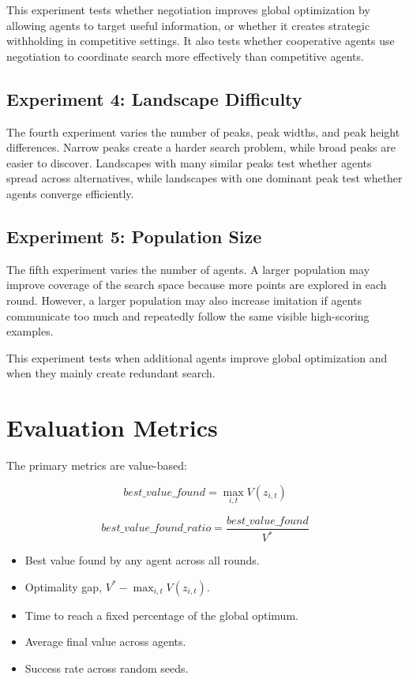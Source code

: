 \documentclass[11pt]{article}
\begin{document}
This experiment tests whether negotiation improves global optimization by allowing agents to target useful information, or whether it creates strategic withholding in competitive settings. It also tests whether cooperative agents use negotiation to coordinate search more effectively than competitive agents.

\subsection{Experiment 4: Landscape Difficulty}

The fourth experiment varies the number of peaks, peak widths, and peak height differences. Narrow peaks create a harder search problem, while broad peaks are easier to discover. Landscapes with many similar peaks test whether agents spread across alternatives, while landscapes with one dominant peak test whether agents converge efficiently.

\subsection{Experiment 5: Population Size}

The fifth experiment varies the number of agents. A larger population may improve coverage of the search space because more points are explored in each round. However, a larger population may also increase imitation if agents communicate too much and repeatedly follow the same visible high-scoring examples.

This experiment tests when additional agents improve global optimization and when they mainly create redundant search.

\section{Evaluation Metrics}

The primary metrics are value-based:

\[
best\_value\_found = \max_{i,t} V(z_{i,t})
\]

\[
best\_value\_found\_ratio = \frac{best\_value\_found}{V^*}
\]

\begin{itemize}[leftmargin=0.3in]
\item Best value found by any agent across all rounds.
\item Optimality gap, $V^* - \max_{i,t} V(z_{i,t})$.
\item Time to reach a fixed percentage of the global optimum.
\item Average final value across agents.
\item Success rate across random seeds.
\end{itemize}
\end{document}
